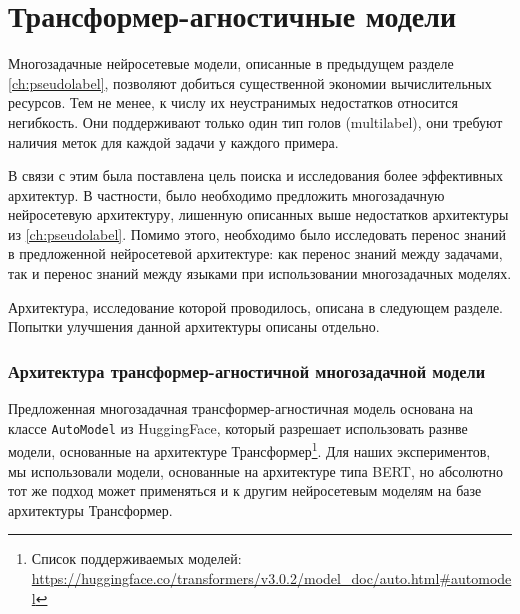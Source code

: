 \chapter{Трансформер-агностичные модели}\label{ch:tr-ag}
Многозадачные нейросетевые модели, описанные в предыдущем разделе \ref{ch:pseudolabel}, позволяют добиться существенной экономии вычислительных ресурсов. Тем не менее, к числу их неустранимых недостатков относится негибкость. Они поддерживают только один тип голов (multilabel), они требуют наличия меток для каждой задачи у каждого примера. 

В связи с этим была поставлена цель поиска и исследования более эффективных архитектур. В частности, было необходимо предложить многозадачную нейросетевую архитектуру, лишенную описанных выше недостатков архитектуры из \ref{ch:pseudolabel}. Помимо этого, необходимо было исследовать перенос знаний в предложенной нейросетевой архитектуре: как перенос знаний между задачами, так и перенос знаний между языками при использовании многозадачных моделях.

Архитектура, исследование которой проводилось, описана в следующем разделе. Попытки улучшения данной архитектуры описаны отдельно. 

\subsection{Архитектура трансформер-агностичной многозадачной модели}\label{ch:tr-ag:architecture} 
Предложенная многозадачная трансформер-агностичная модель основана на классе \texttt{AutoModel} из HuggingFace, который разрешает использовать разнве модели, основанные на архитектуре Трансформер\footnote{Список поддерживаемых моделей: \url{https://huggingface.co/transformers/v3.0.2/model_doc/auto.html\#automodel}}. Для наших экспериментов, мы использовали модели, основанные на архитектуре типа BERT, но абсолютно тот же подход может применяться и к другим нейросетевым моделям на базе архитектуры Трансформер. 

